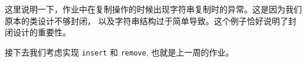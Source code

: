 \documentclass[a4paper]{ctexart}
\theoremstyle{definition}
\theoremstyle{definition}
\begin{document}
  








这里说明一下，作业中在复制操作的时候出现字符串复制时的异常。这是因为我们原本的类设计不够封闭，
以及字符串结构过于简单导致。这个例子恰好说明了封闭设计的重要性。

接下去我们考虑实现 \verb|insert| 和 \verb|remove|, 也就是上一周的作业。
\end{document}

